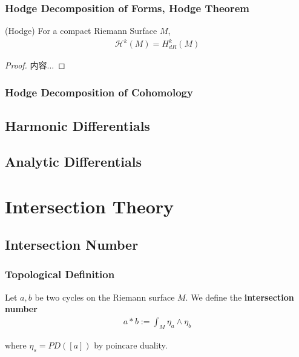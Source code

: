 \documentclass[Total.tex]{subfiles}
\begin{document}
			\subsubsection{Hodge Decomposition of Forms, Hodge Theorem}
				
				\begin{theorem}
					(Hodge) For a compact Riemann Surface $M$,
					\begin{gather*}
						\mathcal{H}^k(M)=H^k_{dR}(M)
					\end{gather*}
				\end{theorem}
				\begin{proof}
					内容...
				\end{proof}
				
			\subsubsection{Hodge Decomposition of Cohomology}
			
			\subsection{Harmonic Differentials}
			
			\subsection{Analytic Differentials}
			
		\section{Intersection Theory}
			\subsection{Intersection Number}
				\subsubsection{Topological Definition}
				\begin{Def}
					Let $a,b$ be two cycles on the Riemann surface $M$. We define the \textbf{intersection number}
					\begin{gather*}
						a*b:=\int_M \eta_a\wedge \eta_b
					\end{gather*}
					
					where $\eta_s=PD([a])$ by poincare duality. 
				\end{Def}
				
\end{document}
